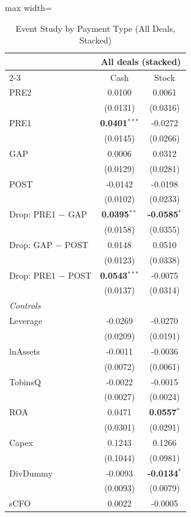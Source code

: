 \begin{table}[htbp]\centering
\caption{Event Study by Payment Type (All Deals, Stacked)}\label{tab:rob_timing_placebo}
\scriptsize\begin{adjustbox}{max width=\linewidth}\begin{tabular}{lcc}
\toprule
 & \multicolumn{2}{c}{\textbf{All deals (stacked)}} \\
\cmidrule(lr){2-3}
 & Cash & Stock \\
\midrule




PRE2 & 0.0100 & 0.0061  \\
 & (0.0131) & (0.0316)  \\
PRE1 & \textbf{0.0401}$^{***}$ & -0.0272  \\
 & (0.0145) & (0.0266)  \\
GAP & 0.0006 & 0.0312  \\
 & (0.0129) & (0.0281)  \\
POST & -0.0142 & -0.0198  \\
 & (0.0102) & (0.0233)  \\
\midrule
Drop: PRE1 $-$ GAP & \textbf{0.0395}$^{**}$ & \textbf{-0.0585}$^{*}$  \\
 & (0.0158) & (0.0355)  \\
Drop: GAP $-$ POST & 0.0148 & 0.0510  \\
 & (0.0123) & (0.0338)  \\
Drop: PRE1 $-$ POST & \textbf{0.0543}$^{***}$ & -0.0075  \\
 & (0.0137) & (0.0314)  \\
\midrule\multicolumn{3}{l}{\textit{Controls}} \\
Leverage & -0.0269 & -0.0270  \\
 & (0.0209) & (0.0191)  \\
lnAssets & -0.0011 & -0.0036  \\
 & (0.0072) & (0.0061)  \\
TobinsQ & -0.0022 & -0.0015  \\
 & (0.0027) & (0.0024)  \\
ROA & 0.0471 & \textbf{0.0557}$^{*}$  \\
 & (0.0301) & (0.0291)  \\
Capex & 0.1243 & 0.1266  \\
 & (0.1044) & (0.0981)  \\
DivDummy & -0.0093 & \textbf{-0.0134}$^{*}$  \\
 & (0.0093) & (0.0079)  \\
sCFO & 0.0022 & -0.0005  \\

\end{tabular}
\end{adjustbox}
\end{table}
